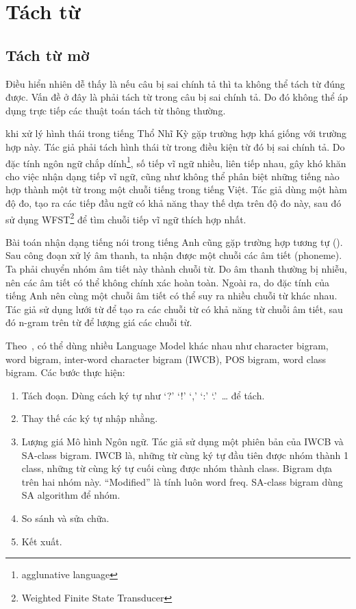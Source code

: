 \documentclass[a4paper,oneside]{book} %
\theoremstyle{break}
\begin{document}
\section{Tách từ}


\subsection{Tách từ mờ}

Điều hiển nhiên dễ thấy là nếu câu bị sai chính tả thì ta không thể
tách từ đúng được. Vấn đề ở đây là phải tách từ trong câu bị sai chính
tả. Do đó không thể áp dụng trực tiếp các thuật toán tách từ thông
thường. 

\cite{Oflazer} khi xử lý hình thái trong tiếng Thổ Nhĩ Kỳ gặp trường
hợp khá giống với trường hợp này. Tác giả phải tách hình thái từ
trong điều kiện từ đó bị sai chính tả. Do đặc tính
ngôn ngữ chắp dính\footnote{agglunative language}, số tiếp vĩ ngữ
nhiều, liên tiếp nhau, gây khó khăn cho việc nhận dạng tiếp vĩ ngữ,
cũng như không thể phân biệt những tiếng nào hợp thành một từ trong
một chuỗi tiếng trong tiếng Việt. Tác giả dùng một hàm độ đo, tạo ra
các tiếp đầu ngữ có khả năng thay thế dựa trên độ đo này, sau đó sử
dụng WFST\footnote{Weighted Finite State Transducer} để tìm chuỗi tiếp
vĩ ngữ thích hợp nhất.

Bài toán nhận dạng tiếng nói trong tiếng Anh cũng gặp trường hợp tương tự
(\cite{Ravishankar}). Sau công đoạn xử lý âm thanh, ta nhận được
một chuỗi các âm tiết (phoneme). Ta phải chuyển nhóm âm tiết này thành
chuỗi từ. Do âm thanh thường bị nhiễu, nên các âm tiết có thể
không chính xác hoàn toàn. Ngoài ra, do đặc tính của tiếng Anh nên
cùng một chuỗi âm tiết có thể suy ra nhiều chuỗi từ khác nhau. Tác giả
sử dụng lưới từ để tạo ra các chuỗi từ có khả năng từ chuỗi âm tiết,
sau đó n-gram trên từ để lượng giá các chuỗi từ.

Theo~\cite{Chang}, có thể dùng nhiều Language Model khác nhau như
character bigram, word bigram, inter-word character bigram (IWCB), POS
bigram, word class bigram. Các bước thực hiện:
\begin{enumerate}
\item Tách đoạn. Dùng cách ký tự như `?' `!' `,'
  `:' `.'~\ldots{} để tách.
\item Thay thế các ký tự nhập nhằng. 
\item Lượng giá Mô hình Ngôn ngữ. Tác giả sử dụng một phiên bản của
  IWCB và SA-class bigram. IWCB là, những từ cùng ký tự đầu tiên được
  nhóm thành 1 class, những từ cùng ký tự cuối cùng được nhóm thành
  class. Bigram dựa trên hai nhóm này. ``Modified'' là tính luôn word
  freq. SA-class bigram dùng SA algorithm để nhóm.
\item So sánh và sửa chữa.
\item Kết xuất.
\end{enumerate}
\end{document}
